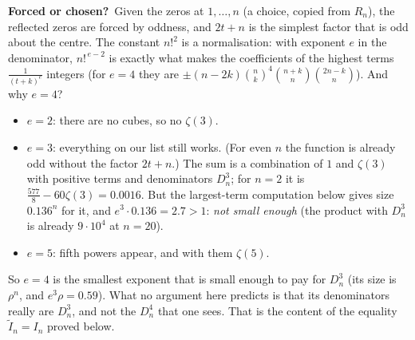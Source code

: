 \documentclass[11pt]{article}
\theoremstyle{remark}
\newcommand{\forced}{\medskip\noindent\textbf{Forced or chosen?}\ }
\begin{document}
\forced Given the zeros at $1,\dots,n$ (a choice, copied from $R_n$), the reflected zeros are
forced by oddness, and $2t+n$ is the simplest factor that is odd about the centre. The constant
$n!^2$ is a normalisation: with exponent $e$ in the denominator, $n!^{\,e-2}$ is exactly what makes
the coefficients of the highest terms $\frac1{(t+k)^e}$ integers (for $e=4$ they are
$\pm(n-2k)\binom nk^4\binom{n+k}n\binom{2n-k}n$). And why $e=4$?
\begin{itemize}
\item $e=2$: there are no cubes, so no $\zeta(3)$.
\item $e=3$: everything on our list still works. (For even $n$ the function is already odd without
the factor $2t+n$.) The sum is a combination of $1$ and $\zeta(3)$ with positive terms and
denominators $D_n^3$; for $n=2$ it is $\frac{577}8-60\zeta(3)=0.0016$. But the largest-term
computation below gives size $0.136^n$ for it, and $e^3\cdot0.136=2.7>1$: \emph{not small enough}
(the product with $D_n^3$ is already $9\cdot10^4$ at $n=20$).
\item $e=5$: fifth powers appear, and with them $\zeta(5)$.
\end{itemize}
So $e=4$ is the smallest exponent that is small enough to pay for $D_n^3$ (its size is $\rho^n$, and
$e^3\rho=0.59$). What no argument here predicts is that its denominators really are $D_n^3$, and not
the $D_n^4$ that one sees. That is the content of the equality $\widetilde I_n=I_n$ proved below.
\end{document}
